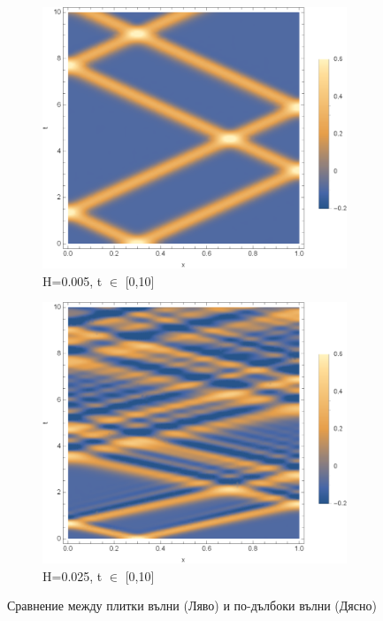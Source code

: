 \documentclass[12pt]{article}
\numberwithin{equation}{section}
\begin{document}
\begin{figure}
    \begin{subfigure}[b]{0.42\textwidth}
        \includegraphics[width=\textwidth]{figures/linear-solution/linear-solution-H_0.005_all-t.eps}
        \caption{H=0.005, t $\in$ [0,10]}
    \end{subfigure}
    \hfill
    \begin{subfigure}[b]{0.42\textwidth}
        \includegraphics[width=\textwidth]{figures/linear-solution/linear-solution-H_0.025_all-t.eps}
        \caption{H=0.025, t $\in$ [0,10]}
    \end{subfigure}
    \captionsetup{justification=centering}
    \caption{Сравнение между плитки вълни (Ляво) и по-дълбоки вълни (Дясно)}
    \label{f:compare-linear-solution}
\end{figure}
\end{document}

